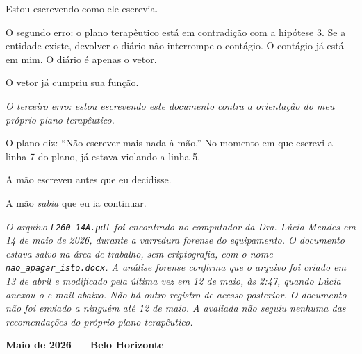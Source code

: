 \noindent Estou escrevendo como ele escrevia.

\noindent O segundo erro: o plano terapêutico está em contradição com a
\noindent hipótese 3. Se a entidade existe, devolver o diário não interrompe
\noindent o contágio. O contágio já está em mim. O diário é apenas o vetor.

\noindent O vetor já cumpriu sua função.

\noindent \textit{O terceiro erro: estou escrevendo este documento contra a orientação do meu próprio plano terapêutico.}

\noindent O plano diz: ``Não escrever mais nada à mão.'' No momento em que escrevi a linha 7 do plano, já estava violando a linha 5.

\noindent A mão escreveu antes que eu decidisse.

\noindent A mão \textit{sabia} que eu ia continuar.

\noindent \textit{O arquivo \texttt{L260-14A.pdf} foi encontrado no computador da Dra. Lúcia
\noindent Mendes em 14 de maio de 2026, durante a varredura forense do equipamento. O
\noindent documento estava salvo na área de trabalho, sem criptografia, com o nome
\texttt{nao\_apagar\_isto.docx}. A análise forense confirma que o arquivo foi criado
\noindent em 13 de abril e modificado pela última vez em 12 de maio, às 2:47, quando
\noindent Lúcia anexou o e-mail abaixo. Não há outro registro de acesso posterior. O
\noindent documento não foi enviado a ninguém até 12 de maio. A avaliada não seguiu
\noindent nenhuma das recomendações do próprio plano terapêutico.}

\noindent \textbf{Maio de 2026 --- Belo Horizonte}

